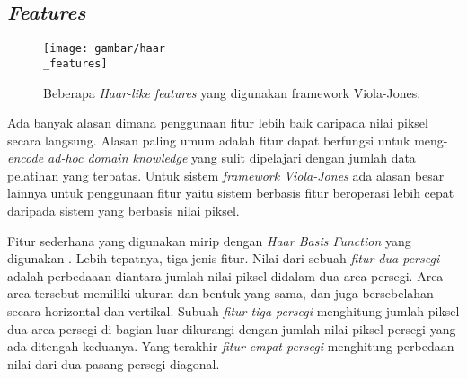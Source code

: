 \subsection{\emph{Features}}

\begin{figure}[H]
  \centering{}
	\texttt{[image: gambar/haar\\\_features]}
  \caption{Beberapa \emph{Haar-like features} yang digunakan framework Viola-Jones.}
\end{figure}

Ada banyak alasan dimana penggunaan fitur lebih baik daripada 
nilai piksel secara langsung. Alasan paling umum adalah fitur dapat berfungsi
untuk meng-\emph{encode ad-hoc domain knowledge} yang sulit dipelajari 
dengan jumlah data pelatihan yang terbatas. Untuk sistem \emph{framework Viola-Jones} 
ada alasan besar lainnya untuk penggunaan fitur yaitu sistem berbasis fitur beroperasi lebih cepat
daripada sistem yang berbasis nilai piksel.

Fitur sederhana yang digunakan mirip dengan \emph{Haar Basis Function} yang 
digunakan \cite{papaetal}. Lebih tepatnya, tiga jenis fitur. 
Nilai dari sebuah \emph{fitur dua persegi} adalah perbedaaan diantara 
jumlah nilai piksel didalam dua area persegi. Area-area tersebut memiliki 
ukuran dan bentuk yang sama, dan juga bersebelahan secara horizontal dan vertikal.
Subuah \emph{fitur tiga persegi} menghitung jumlah piksel dua area persegi 
di bagian luar dikurangi dengan jumlah nilai piksel persegi yang ada ditengah keduanya. 
Yang terakhir \emph{fitur empat persegi} menghitung perbedaan nilai dari dua pasang 
persegi diagonal.



